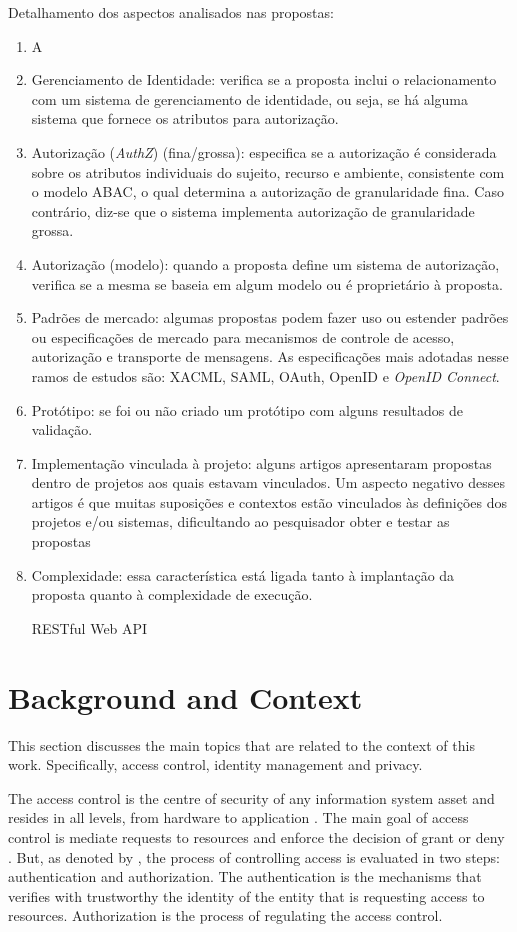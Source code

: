\documentclass{doublecol-new}
\begin{document}
Detalhamento dos aspectos analisados nas propostas:
\begin{enumerate}
	\item A
	\item Gerenciamento de Identidade: verifica se a proposta inclui o relacionamento com um sistema de gerenciamento de identidade, ou seja, se há alguma sistema que fornece os atributos para autorização.
	\item Autorização (\textit{AuthZ}) (fina/grossa): especifica se a autorização é considerada sobre os atributos individuais do sujeito, recurso e ambiente, consistente com o modelo ABAC, o qual determina a autorização de granularidade fina. Caso contrário, diz-se que o sistema implementa autorização de granularidade grossa.
	\item Autorização (modelo): quando a proposta define um sistema de autorização, verifica se a mesma se baseia em algum modelo ou é proprietário à proposta.
	\item Padrões de mercado: algumas propostas podem fazer uso ou estender padrões ou especificações de mercado para mecanismos de controle de acesso, autorização e transporte de mensagens. As especificações mais adotadas nesse ramos de estudos são: XACML, SAML, OAuth, OpenID e \textit{OpenID Connect}.
	\item Protótipo: se foi ou não criado um protótipo com alguns resultados de validação.
	\item Implementação vinculada à projeto: alguns artigos apresentaram propostas dentro de projetos aos quais estavam vinculados. Um aspecto negativo desses artigos é que muitas suposições e contextos estão vinculados às definições dos projetos e/ou sistemas, dificultando ao pesquisador obter e testar as propostas
	\item Complexidade: essa característica está ligada tanto à implantação da proposta quanto à complexidade de execução.
	
	RESTful Web API
	
\end{enumerate}


\section{Background and Context}
This section discusses the main topics that are related to the context of this work. Specifically, access control, identity management and privacy.

The access control is the centre of security of any information system asset and resides in all levels, from hardware to application \citep{anderson2008security}. The main goal of access control is mediate requests to resources and enforce the decision of grant or deny \citep{samarati2001access}. But, as denoted by \cite{gollmann2011compsecurity}, the process of controlling access is evaluated in two steps: authentication and authorization. The authentication is the mechanisms that verifies with trustworthy the identity of the entity that is requesting access to resources. Authorization is the process of regulating the access control.
\end{document}
